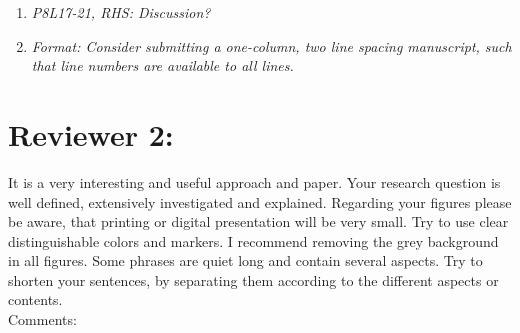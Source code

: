 \documentclass{article}
\begin{document}
\begin{enumerate}
  
  \item \textit{P8L17-21, RHS: Discussion?}
  
    \answer{}
  
  \item \textit{Format: Consider submitting a one-column, two line spacing manuscript, such that line numbers are available to all lines.}
  
   
\end{enumerate} 
  

\section*{Reviewer 2:}

It is a very interesting and useful approach and paper. Your research question is well defined, extensively investigated and explained. Regarding your figures please be aware, that printing or digital presentation will be very small. Try to use clear distinguishable colors and markers. I recommend removing the grey background in all figures. Some phrases are quiet long and contain several aspects. Try to shorten your sentences, by separating them according to the different aspects or contents.\\

Comments:\\
\end{document}
